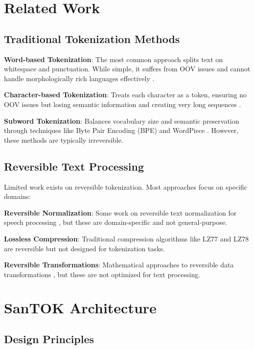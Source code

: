 \documentclass[conference]{IEEEtran}
\begin{document}
\section{Related Work}

\subsection{Traditional Tokenization Methods}

\textbf{Word-based Tokenization}: The most common approach splits text on whitespace and punctuation. While simple, it suffers from OOV issues and cannot handle morphologically rich languages effectively \cite{jurafsky2020}.

\textbf{Character-based Tokenization}: Treats each character as a token, ensuring no OOV issues but losing semantic information and creating very long sequences \cite{sennrich2016}.

\textbf{Subword Tokenization}: Balances vocabulary size and semantic preservation through techniques like Byte Pair Encoding (BPE) \cite{gage1994} and WordPiece \cite{schuster2012}. However, these methods are typically irreversible.

\subsection{Reversible Text Processing}

Limited work exists on reversible tokenization. Most approaches focus on specific domains:

\textbf{Reversible Normalization}: Some work on reversible text normalization for speech processing \cite{sproat2016}, but these are domain-specific and not general-purpose.

\textbf{Lossless Compression}: Traditional compression algorithms like LZ77 \cite{ziv1977} and LZ78 \cite{ziv1978} are reversible but not designed for tokenization tasks.

\textbf{Reversible Transformations}: Mathematical approaches to reversible data transformations \cite{cover2006}, but these are not optimized for text processing.

\section{SanTOK Architecture}

\subsection{Design Principles}
\end{document}
